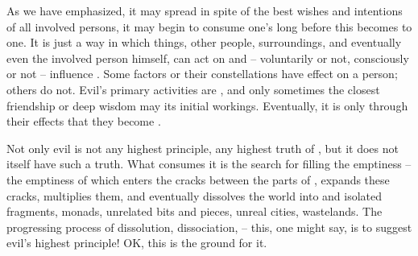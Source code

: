 {As we have emphasized, it may spread in spite of the best wishes and intentions
of all involved persons, it may begin to consume one's  long before
this becomes  to one.  It is just a way in which things, other
people, surroundings, and eventually even the involved person himself, can act
on and -- voluntarily or not, consciously or not -- influence .
Some factors or their constellations have  effect on a person;
others do not.  Evil's primary activities are , and only sometimes
the closest friendship or deep wisdom may  its initial 
workings.  Eventually, it is only through their effects that they become
. 

\pa\label{pa:evilNoPrincip} Not only evil is not any highest principle, any
highest truth of 
, but it does not itself have such a truth. What consumes it is
the search for filling the emptiness -- the emptiness of  which
enters the cracks between the  parts of , expands
these cracks, multiplies them, and eventually dissolves the world into 
and  isolated fragments, monads, unrelated bits and pieces, unreal cities,
wastelands.  The progressing process of dissolution, dissociation,
 -- this, one might say, is to suggest evil's highest principle!
OK, this is the ground for  it.

}

